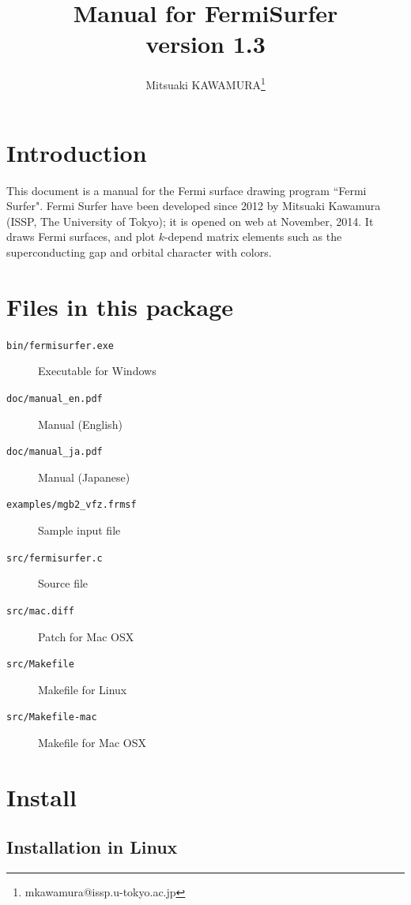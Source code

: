 \documentclass[12pt]{article}
\begin{document}
%
%
\title{Manual for FermiSurfer\\
version 1.3}
\author{Mitsuaki KAWAMURA\footnote{mkawamura@issp.u-tokyo.ac.jp}}
\maketitle

\tableofcontents

\section{Introduction}

This document is a manual for the Fermi surface drawing program ``Fermi Surfer".
Fermi Surfer have been  developed since 2012 by Mitsuaki Kawamura
(ISSP, The University of Tokyo); 
it is opened on web at November, 2014.
It draws Fermi surfaces, and 
plot $k$-depend matrix elements such as the superconducting gap and
orbital character with colors.

\section{Files in this package}

\begin{description}
\item[\texttt{bin/fermisurfer.exe}] Executable for Windows
\item[\texttt{doc/manual\_en.pdf}] Manual (English)
\item[\texttt{doc/manual\_ja.pdf}] Manual (Japanese)
\item[\texttt{examples/mgb2\_vfz.frmsf}] Sample input file
\item[\texttt{src/fermisurfer.c}] Source file
\item[\texttt{src/mac.diff}] Patch for Mac OSX
\item[\texttt{src/Makefile}] Makefile for Linux
\item[\texttt{src/Makefile-mac}] Makefile for Mac OSX
\end{description}

\section{Install}

\subsection{Installation in Linux}
\end{document}
